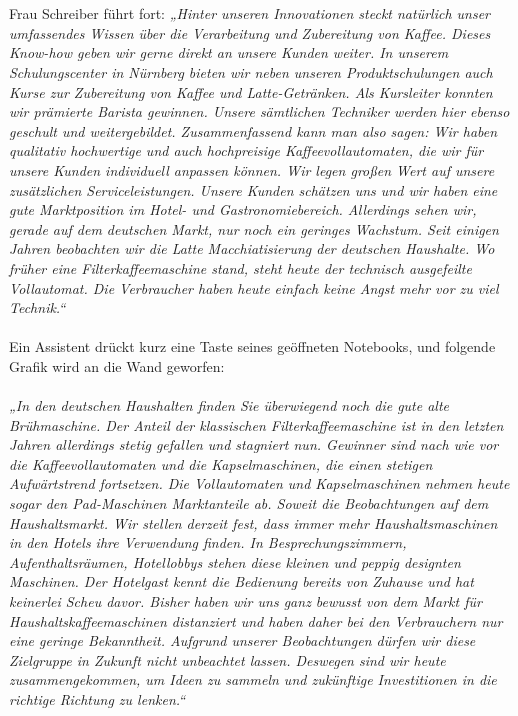 {\\~\\
Frau Schreiber führt fort: \textit{„Hinter unseren Innovationen steckt natürlich unser umfassendes Wissen über die Verarbeitung und Zubereitung von Kaffee. Dieses Know-how geben wir gerne direkt an unsere Kunden weiter. In unserem Schulungscenter in Nürnberg bieten wir neben unseren Produktschulungen auch Kurse zur Zubereitung von Kaffee und Latte-Getränken. Als Kursleiter konnten wir prämierte Barista gewinnen. Unsere sämtlichen Techniker werden hier ebenso geschult und weitergebildet. Zusammenfassend kann man also sagen: Wir haben qualitativ hochwertige und auch hochpreisige Kaffeevollautomaten, die wir für unsere Kunden individuell anpassen können. Wir legen großen Wert auf unsere zusätzlichen Serviceleistungen. Unsere Kunden schätzen uns und wir haben eine gute Marktposition im Hotel- und Gastronomiebereich. Allerdings sehen wir, gerade auf dem deutschen Markt, nur noch ein geringes Wachstum. Seit einigen Jahren beobachten wir die Latte Macchiatisierung der deutschen Haushalte. Wo früher eine Filterkaffeemaschine stand, steht heute der technisch ausgefeilte Vollautomat. Die Verbraucher haben heute einfach keine Angst mehr vor zu viel Technik.“}
\\~\\
Ein Assistent drückt kurz eine Taste seines geöffneten Notebooks, und folgende Grafik wird an die Wand geworfen: 
\\~\\
\textit{„In den deutschen Haushalten finden Sie überwiegend noch die gute alte Brühmaschine. Der Anteil der klassischen Filterkaffeemaschine ist in den letzten Jahren allerdings stetig gefallen und stagniert nun. Gewinner sind nach wie vor die Kaffeevollautomaten und die Kapselmaschinen, die einen stetigen Aufwärtstrend fortsetzen. Die Vollautomaten und Kapselmaschinen nehmen heute sogar den Pad-Maschinen Marktanteile ab. Soweit die Beobachtungen auf dem Haushaltsmarkt. Wir stellen derzeit fest, dass immer mehr Haushaltsmaschinen in den Hotels ihre Verwendung finden. In Besprechungszimmern, Aufenthaltsräumen, Hotellobbys stehen diese kleinen und peppig designten Maschinen. Der Hotelgast kennt die Bedienung bereits von Zuhause und hat keinerlei Scheu davor. Bisher haben wir uns ganz bewusst von dem Markt für Haushaltskaffeemaschinen distanziert und haben daher bei den Verbrauchern nur eine geringe Bekanntheit. Aufgrund unserer Beobachtungen dürfen wir diese Zielgruppe in Zukunft nicht unbeachtet lassen. Deswegen sind wir heute zusammengekommen, um Ideen zu sammeln und zukünftige Investitionen in die richtige Richtung zu lenken.“}
}
